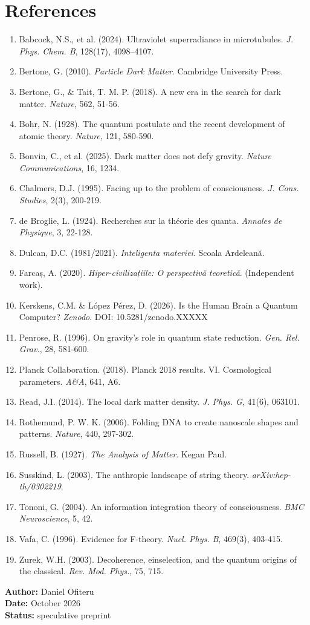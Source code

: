 \documentclass[11pt,a4paper]{article}
\begin{document}
\section*{References}
\begin{enumerate}
    \item Babcock, N.S., et al. (2024). Ultraviolet superradiance in microtubules. \textit{J. Phys. Chem. B}, 128(17), 4098--4107.
    \item Bertone, G. (2010). \textit{Particle Dark Matter}. Cambridge University Press.
    \item Bertone, G., \& Tait, T. M. P. (2018). A new era in the search for dark matter. \textit{Nature}, 562, 51-56.
    \item Bohr, N. (1928). The quantum postulate and the recent development of atomic theory. \textit{Nature}, 121, 580-590.
    \item Bonvin, C., et al. (2025). Dark matter does not defy gravity. \textit{Nature Communications}, 16, 1234.
    \item Chalmers, D.J. (1995). Facing up to the problem of consciousness. \textit{J. Cons. Studies}, 2(3), 200-219.
    \item de Broglie, L. (1924). Recherches sur la théorie des quanta. \textit{Annales de Physique}, 3, 22-128.
    \item Dulcan, D.C. (1981/2021). \textit{Inteligenta materiei}. Scoala Ardeleană.
    \item Farcaș, A. (2020). \textit{Hiper-civilizațiile: O perspectivă teoretică}. (Independent work).
    \item Kerskens, C.M. \& López Pérez, D. (2026). Is the Human Brain a Quantum Computer? \textit{Zenodo}. DOI: 10.5281/zenodo.XXXXX
    \item Penrose, R. (1996). On gravity's role in quantum state reduction. \textit{Gen. Rel. Grav.}, 28, 581-600.
    \item Planck Collaboration. (2018). Planck 2018 results. VI. Cosmological parameters. \textit{A\&A}, 641, A6.
    \item Read, J.I. (2014). The local dark matter density. \textit{J. Phys. G}, 41(6), 063101.
    \item Rothemund, P. W. K. (2006). Folding DNA to create nanoscale shapes and patterns. \textit{Nature}, 440, 297-302.
    \item Russell, B. (1927). \textit{The Analysis of Matter}. Kegan Paul.
    \item Susskind, L. (2003). The anthropic landscape of string theory. \textit{arXiv:hep-th/0302219}.
    \item Tononi, G. (2004). An information integration theory of consciousness. \textit{BMC Neuroscience}, 5, 42.
    \item Vafa, C. (1996). Evidence for F-theory. \textit{Nucl. Phys. B}, 469(3), 403-415.
    \item Zurek, W.H. (2003). Decoherence, einselection, and the quantum origins of the classical. \textit{Rev. Mod. Phys.}, 75, 715.
\end{enumerate}

\vspace{1cm}
\begin{flushright}
\textbf{Author:} Daniel Ofiteru \\
\textbf{Date:} October 2026 \\
\textbf{Status:} speculative preprint
\end{flushright}
\end{document}
